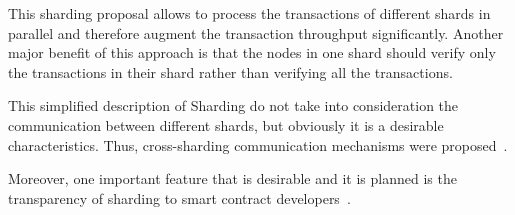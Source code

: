This sharding proposal allows to process the transactions of different shards
in parallel and therefore augment the transaction throughput significantly.
Another major benefit of this approach is that the nodes in one shard
should verify only the transactions in their shard rather than verifying all the
transactions.

This simplified description of Sharding do not take into consideration the
communication between different shards, but obviously it is a desirable
characteristics. Thus, cross-sharding communication mechanisms were
proposed~\cite{bib:sharding-faq}.

Moreover, one important feature that is desirable and it is planned is the
transparency of sharding to smart contract developers~\cite{bib:sharding-faq}.
